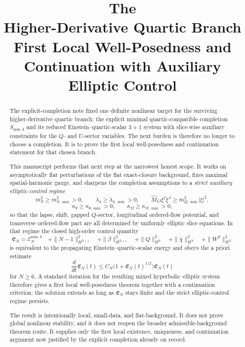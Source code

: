 \documentclass[11pt]{article}
\title{\textbf{The \TheoryName{}}\\[0.4em]
\large Higher-Derivative Quartic Branch First Local Well-Posedness and Continuation with Auxiliary Elliptic Control}
\author{}
\date{}
\begin{document}
\maketitle

\begin{abstract}
The explicit-completion note fixed one definite nonlinear target for the surviving higher-derivative quartic branch: the explicit minimal quartic-compatible completion \(S_{\mathrm{min},4}\) and its reduced Einstein--quartic-scalar \(3+1\) system with slice-wise auxiliary constraints for the \(Q\)- and \(U\)-sector variables. The next burden is therefore no longer to choose a completion. It is to prove the first local well-posedness and continuation statement for that chosen branch.

This manuscript performs that next step at the narrowest honest scope. It works on asymptotically flat perturbations of the flat exact-closure background, fixes maximal spatial-harmonic gauge, and sharpens the completion assumptions to a \emph{strict auxiliary elliptic-control regime}
\[
m_S^2\ge m_{S,\min}^2>0,\qquad
\lambda_4\ge \lambda_{4,\min}>0,\qquad
\widehat M_{IJ}\xi^I\xi^J\ge m_{Q,\min}^2|\xi|^2,
\]
\[
\kappa_\theta\ge \kappa_{\theta,\min}>0,
\qquad
\kappa_\Omega\ge \kappa_{\Omega,\min}>0,
\]
so that the lapse, shift, gapped \(Q\)-sector, longitudinal ordered-flow potential, and transverse ordered-flow part are all determined by uniformly elliptic slice equations. In that regime the closed high-order control quantity
\[
\mathfrak E_N
=
\mathcal E_N^{\mathrm{min},4}
\quad + \|N-1\|_{H^{N+1}}^2
\quad + \|\beta\|_{H^{N+1}}^2
\quad + \|Q\|_{H^N}^2
\quad + \|\chi\|_{H^N}^2
\quad + \|W^T\|_{H^N}^2
\]
is equivalent to the propagating Einstein--quartic-scalar energy and obeys the a priori estimate
\[
\frac{d}{dt}\mathfrak E_N(t)
\le
C_N\bigl(1+\mathfrak E_N(t)^{1/2}\bigr)\mathfrak E_N(t)
\]
for \(N\ge 6\). A standard iteration for the resulting mixed hyperbolic--elliptic system therefore gives a first local well-posedness theorem together with a continuation criterion: the solution extends as long as \(\mathfrak E_N\) stays finite and the strict elliptic-control regime persists.

The result is intentionally local, small-data, and flat-background. It does not prove global nonlinear stability, and it does not reopen the broader admissible-background theorem route. It supplies only the first local existence, uniqueness, and continuation argument now justified by the explicit completion already on record.
\end{abstract}
\end{document}
